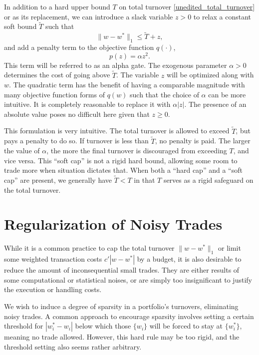 \documentclass[11pt, letterpaper]{article}
\begin{document}

In addition to a hard upper bound $T$ on total turnover \eqref{unedited_total_turnover} or as its replacement, we can introduce
a slack variable $z > 0$ to relax a constant soft bound $\tilde{T}$ such that
\begin{equation*}
	\lVert w - w^*\rVert_1 \leq \tilde{T} + z,
\end{equation*}
and add a penalty term to the objective function $q(\cdot)$,
\begin{equation}\label{eq:tvr-total}
	p(z) = \alpha z^2.
\end{equation}
This term will be referred to as an alpha gate.
The exogenous parameter $\alpha > 0$ determines the cost of going above $\tilde{T}$. The variable $z$ will be optimized along
with $w$. The quadratic term has the benefit of having a comparable magnitude with many objective function forms of $q(w)$ such
that the choice of $\alpha$ can be more intuitive. It is completely reasonable to replace it with $\alpha |z|$. The presence of
an absolute value poses no difficult here given that $z \geq 0$.

This formulation is very intuitive. The total turnover is allowed to exceed $\tilde{T}$, but pays a penalty to do so. If
turnover is less than $\tilde{T}$, no penalty is paid. The larger the value of $\alpha$, the more the final turnover is
discouraged from exceeding $T$, and vice versa. This ``soft cap'' is not a rigid hard bound, allowing some room to trade more
when situation dictates that. When both a ``hard cap'' and a ``soft cap'' are present, we generally have $\tilde{T} < T$ in
that $T$ serves as a rigid safeguard on the total turnover.

\section{Regularization of Noisy Trades}

While it is a common practice to cap the total turnover $\lVert w - w^*\rVert_1$ or limit some weighted transaction costs
$c' |w - w^*|$ by a budget, it is also desirable to reduce the amount of inconsequential small trades. They are either
results of some computational or statistical noises, or are simply too insignificant to justify the execution or handling
costs.

We wish to induce a degree of sparsity in a portfolio's turnovers, eliminating noisy trades. A common approach to encourage
sparsity involves setting a certain threshold for $\left |w^*_i - w_i \right|$ below which those $\{w_i\}$ will be forced to
stay at $\{w_i^*\}$, meaning no trade allowed. However, this hard rule may be too rigid, and the threshold setting also seems
rather arbitrary.
\end{document}
